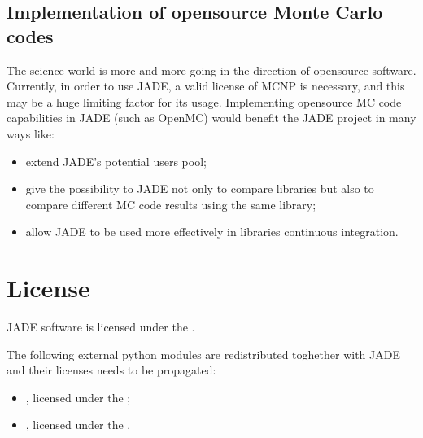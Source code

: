 \documentclass[letterpaper,10pt,english]{sphinxmanual}
\begin{document}
\section{Implementation of open\sphinxhyphen{}source Monte Carlo codes}
\label{\detokenize{futuredev:implementation-of-open-source-monte-carlo-codes}}
\sphinxAtStartPar
The science world is more and more going in the direction of open\sphinxhyphen{}source
software. Currently, in order to use JADE, a valid license of MCNP is
necessary, and this may be a huge limiting factor for its usage. Implementing
open\sphinxhyphen{}source MC code capabilities in JADE (such as OpenMC) would benefit
the JADE project in many ways like:
\begin{itemize}
\item {} 
\sphinxAtStartPar
extend JADE’s potential users pool;

\item {} 
\sphinxAtStartPar
give the possibility to JADE not only to compare libraries but also to
compare different MC code results using the same library;

\item {} 
\sphinxAtStartPar
allow JADE to be used more effectively in libraries continuous integration.

\end{itemize}


\chapter{License}
\label{\detokenize{LICENSE:license}}\label{\detokenize{LICENSE::doc}}
\sphinxAtStartPar
JADE software is licensed under the {\hyperref[\detokenize{LICENSE:gnulicense}]{}}.

\sphinxAtStartPar
The following external python modules are re\sphinxhyphen{}distributed toghether with
JADE and their licenses needs to be propagated:
\begin{itemize}
\item {} 
\sphinxAtStartPar
{}, licensed under the {\hyperref[\detokenize{LICENSE:gnulicense}]{}};

\item {} 
\sphinxAtStartPar
{}, licensed under the {\hyperref[\detokenize{LICENSE:pynelicense}]{}}.

\end{itemize}
\end{document}
